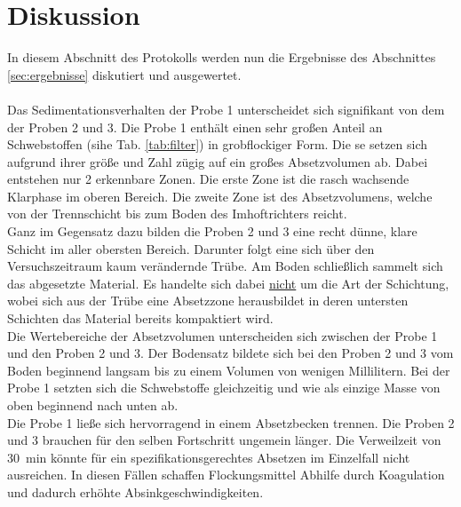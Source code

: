 \chapter{Diskussion}
\label{sec:diskussion}
In diesem Abschnitt des Protokolls werden nun die Ergebnisse des Abschnittes \ref{sec:ergebnisse} diskutiert und ausgewertet.\\\\


Das Sedimentationsverhalten der Probe 1 unterscheidet sich signifikant von dem der Proben 2 und 3. Die Probe 1 enthält einen sehr großen Anteil an Schwebstoffen (sihe Tab. \ref{tab:filter}) in grobflockiger Form. Die se setzen sich aufgrund ihrer größe und Zahl zügig auf ein großes Absetzvolumen ab. Dabei entstehen nur 2 erkennbare Zonen. Die erste Zone ist die rasch wachsende Klarphase im oberen Bereich. Die zweite Zone ist des Absetzvolumens, welche von der Trennschicht bis zum Boden des Imhoftrichters reicht.\\
Ganz im Gegensatz dazu bilden die Proben 2 und 3 eine recht dünne, klare Schicht im aller obersten Bereich. Darunter folgt eine sich über den Versuchszeitraum kaum verändernde Trübe. Am Boden schließlich sammelt sich das abgesetzte Material. Es handelte sich dabei \underline{nicht} um die Art der Schichtung, wobei sich aus der Trübe eine Absetzzone herausbildet in deren untersten Schichten das Material bereits kompaktiert wird.\\
Die Wertebereiche der Absetzvolumen unterscheiden sich zwischen der Probe 1 und den Proben 2 und 3. Der Bodensatz bildete sich bei den Proben 2 und 3 vom Boden beginnend langsam bis zu einem Volumen von wenigen Millilitern.
Bei der Probe 1 setzten sich  die Schwebstoffe gleichzeitig und wie als einzige Masse von oben beginnend nach unten ab.\\
Die Probe 1 ließe sich hervorragend in einem Absetzbecken trennen. Die Proben 2 und 3 brauchen für den selben Fortschritt ungemein länger. Die Verweilzeit von \SI{30}{\minute} könnte für ein spezifikationsgerechtes Absetzen im Einzelfall nicht ausreichen. In diesen Fällen schaffen Flockungsmittel Abhilfe durch Koagulation und dadurch erhöhte Absinkgeschwindigkeiten.\\




